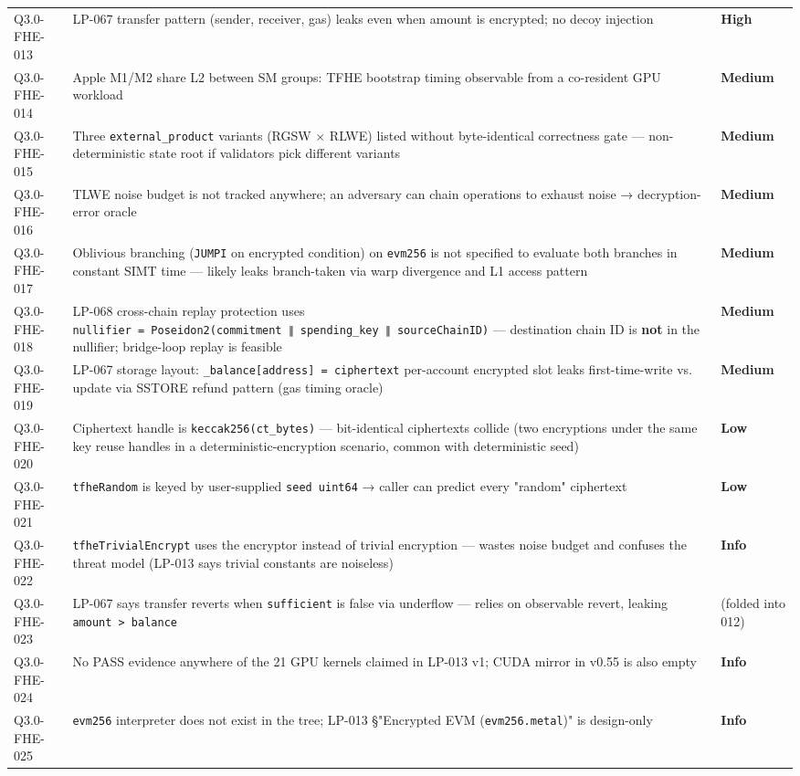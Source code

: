 \documentclass[
]{article}
\begin{document}
{\begin{longtable}[]{@{}lll@{}}
Q3.0-FHE-013 & LP-067 transfer pattern (sender, receiver, gas) leaks
even when amount is encrypted; no decoy injection & \textbf{High} \\
Q3.0-FHE-014 & Apple M1/M2 share L2 between SM groups: TFHE bootstrap
timing observable from a co-resident GPU workload & \textbf{Medium} \\
Q3.0-FHE-015 & Three \texttt{external\_product} variants (RGSW × RLWE)
listed without byte-identical correctness gate --- non-deterministic
state root if validators pick different variants & \textbf{Medium} \\
Q3.0-FHE-016 & TLWE noise budget is not tracked anywhere; an adversary
can chain operations to exhaust noise → decryption-error oracle &
\textbf{Medium} \\
Q3.0-FHE-017 & Oblivious branching (\texttt{JUMPI} on encrypted
condition) on \texttt{evm256} is not specified to evaluate both branches
in constant SIMT time --- likely leaks branch-taken via warp divergence
and L1 access pattern & \textbf{Medium} \\
Q3.0-FHE-018 & LP-068 cross-chain replay protection uses
\texttt{nullifier\ =\ Poseidon2(commitment\ ∥\ spending\_key\ ∥\ sourceChainID)}
--- destination chain ID is \textbf{not} in the nullifier; bridge-loop
replay is feasible & \textbf{Medium} \\
Q3.0-FHE-019 & LP-067 storage layout:
\texttt{\_balance{[}address{]}\ =\ ciphertext} per-account encrypted
slot leaks first-time-write vs. update via SSTORE refund pattern (gas
timing oracle) & \textbf{Medium} \\
Q3.0-FHE-020 & Ciphertext handle is \texttt{keccak256(ct\_bytes)} ---
bit-identical ciphertexts collide (two encryptions under the same key
reuse handles in a deterministic-encryption scenario, common with
deterministic seed) & \textbf{Low} \\
Q3.0-FHE-021 & \texttt{tfheRandom} is keyed by user-supplied
\texttt{seed\ uint64} → caller can predict every "random" ciphertext &
\textbf{Low} \\
Q3.0-FHE-022 & \texttt{tfheTrivialEncrypt} uses the encryptor instead of
trivial encryption --- wastes noise budget and confuses the threat model
(LP-013 says trivial constants are noiseless) & \textbf{Info} \\
Q3.0-FHE-023 & LP-067 says transfer reverts when \texttt{sufficient} is
false via underflow --- relies on observable revert, leaking
\texttt{amount\ \textgreater{}\ balance} & (folded into 012) \\
Q3.0-FHE-024 & No PASS evidence anywhere of the 21 GPU kernels claimed
in LP-013 v1; CUDA mirror in v0.55 is also empty & \textbf{Info} \\
Q3.0-FHE-025 & \texttt{evm256} interpreter does not exist in the tree;
LP-013 §"Encrypted EVM (\texttt{evm256.metal})" is design-only &
\textbf{Info} \\
\end{longtable}
}
\end{document}
